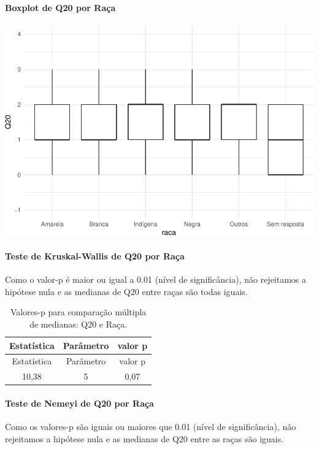 \documentclass[]{article}
\let\oldparagraph\paragraph
\renewcommand{\paragraph}[1]{\oldparagraph{#1}\mbox{}}
\begin{document}
\hypertarget{boxplot-de-q20-por-rauxe7a}{%
\paragraph{Boxplot de Q20 por Raça}\label{boxplot-de-q20-por-rauxe7a}}

\begin{center}\includegraphics[width=0.75\linewidth]{relatorio_covid19_files/figure-latex/unnamed-chunk-402-1} \end{center}

\hypertarget{teste-de-kruskal-wallis-de-q20-por-rauxe7a}{%
\paragraph{Teste de Kruskal-Wallis de Q20 por Raça}\label{teste-de-kruskal-wallis-de-q20-por-rauxe7a}}

Como o valor-p é maior ou igual a 0.01 (nível de significância), não rejeitamos a hipótese nula e as medianas de Q20 entre raças são todas iguais.

\begin{longtable}[]{@{}ccc@{}}
\caption{\label{tab:unnamed-chunk-404}Valores-p para comparação múltipla de medianas: Q20 e Raça.}\tabularnewline
\toprule
Estatística & Parâmetro & valor p\tabularnewline
\midrule
\endfirsthead
\toprule
Estatística & Parâmetro & valor p\tabularnewline
\midrule
\endhead
10,38 & 5 & 0,07\tabularnewline
\bottomrule
\end{longtable}

\hypertarget{teste-de-nemeyi-de-q20-por-rauxe7a}{%
\paragraph{Teste de Nemeyi de Q20 por Raça}\label{teste-de-nemeyi-de-q20-por-rauxe7a}}

Como os valores-p são iguais ou maiores que 0.01 (nível de significância), não rejeitamos a hipótese nula e as medianas de Q20 entre as raças são iguais.
\end{document}

